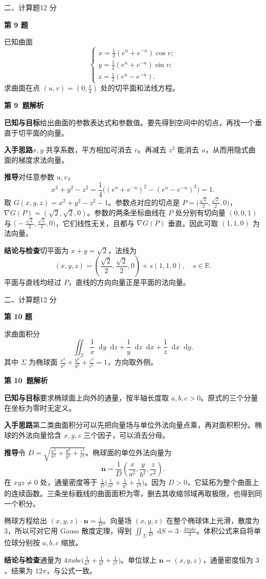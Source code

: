 \documentclass[UTF8,zihao=-4,fontset=fandol]{ctexart}
\newcommand{\dd}{\mathop{}\!\mathrm{d}}
\newcommand{\Question}[3]{%
  \clearpage
  \def\CurrentNumber{#1}%
  \pdfbookmark[1]{第 #1 题}{q#1}%
  {\small #2\hfill #3 分}\par\medskip
  {\Large\bfseries 第 #1 题}\par\medskip
  \fontsize{14}{22}\selectfont
}
\newcommand{\Solution}{%
  \clearpage
  \fontsize{12}{18}\selectfont
  {\large\bfseries 第 \CurrentNumber\ 题解析}\par\smallskip
}
\newcommand{\Known}{\par\textbf{已知与目标}\quad}
\newcommand{\Method}{\par\textbf{入手思路}\quad}
\newcommand{\Derive}{\par\textbf{推导}\quad}
\newcommand{\Verify}{\par\textbf{结论与检查}\quad}
\begin{document}
\Question{9}{二、计算题}{12}
已知曲面
\[
\begin{cases}
x=\frac{1}{2}(e^u+e^{-u})\cos v;\\
y=\frac{1}{2}(e^u+e^{-u})\sin v;\\
z=\frac{1}{2}(e^u-e^{-u}).
\end{cases}
\]
求曲面在点 $(u,v)=\left(0,\frac{\pi}{4}\right)$ 处的切平面和法线方程。

\Solution
\Known 给出曲面的参数表达式和参数值。要先得到空间中的切点，再找一个垂直于切平面的向量。
\Method $x,y$ 共享系数，平方相加可消去 $v$。再减去 $z^2$ 能消去 $u$，从而用隐式曲面的梯度求法向量。
\Derive 对任意参数 $u,v$，
\[
x^2+y^2-z^2
=\frac14\bigl((e^u+e^{-u})^2-(e^u-e^{-u})^2\bigr)=1.
\]
取 $G(x,y,z)=x^2+y^2-z^2-1$。参数点对应的切点是
$P=\bigl(\frac{\sqrt2}{2},\frac{\sqrt2}{2},0\bigr)$，
$\nabla G(P)=(\sqrt2,\sqrt2,0)$。参数的两条坐标曲线在 $P$ 处分别有切向量 $(0,0,1)$ 与 $\bigl(-\frac{\sqrt2}{2},\frac{\sqrt2}{2},0\bigr)$，它们线性无关，且都与 $\nabla G(P)$ 垂直。因此可取 $(1,1,0)$ 为法向量。
\Verify 切平面为 $\boxed{x+y=\sqrt2}$，法线为
\[
\boxed{(x,y,z)=\left(\frac{\sqrt2}{2},\frac{\sqrt2}{2},0\right)+s(1,1,0),\quad s\in\mathbb R}.
\]
平面与直线均经过 $P$，直线的方向向量正是平面的法向量。

\Question{10}{二、计算题}{12}
求曲面积分
\[
\iint_\Sigma\frac{1}{x}\dd y\dd z+\frac{1}{y}\dd z\dd x+\frac{1}{z}\dd x\dd y.
\]
其中 $\Sigma$ 为椭球面 $\frac{x^2}{a^2}+\frac{y^2}{b^2}+\frac{z^2}{c^2}=1$，方向取外侧。

\Solution
\Known 要求椭球面上向外的通量，按半轴长度取 $a,b,c>0$。原式的三个分量在坐标为零时无定义。
\Method 第二类曲面积分可以先把向量场与单位外法向量点乘，再对面积积分。椭球的外法向量恰含 $x,y,z$ 三个因子，可以消去分母。
\Derive 令 $D=\sqrt{\frac{x^2}{a^4}+\frac{y^2}{b^4}+\frac{z^2}{c^4}}$。椭球面的单位外法向量为
\[
\mathbf n=\frac{1}{D}\left(\frac{x}{a^2},\frac{y}{b^2},\frac{z}{c^2}\right).
\]
在 $xyz\ne0$ 处，通量密度等于 $\frac{1}{D}\bigl(\frac{1}{a^2}+\frac{1}{b^2}+\frac{1}{c^2}\bigr)$。因为 $D>0$，它延拓为整个曲面上的连续函数。三条坐标截线的曲面面积为零，删去其收缩邻域再取极限，也得到同一个积分。

椭球方程给出 $(x,y,z)\cdot\mathbf n=\frac{1}{D}$。向量场 $(x,y,z)$ 在整个椭球体上光滑，散度为 $3$，所以可对它用 Gauss 散度定理，得到 $\iint_\Sigma\frac{1}{D}\dd S=3\cdot\frac{4\pi abc}{3}$。体积公式来自将单位球分别按 $a,b,c$ 缩放。
\Verify 通量为 $\boxed{4\pi abc\bigl(\frac{1}{a^2}+\frac{1}{b^2}+\frac{1}{c^2}\bigr)}$。单位球上 $\mathbf n=(x,y,z)$，通量密度恒为 $3$，结果为 $12\pi$，与公式一致。
\end{document}
